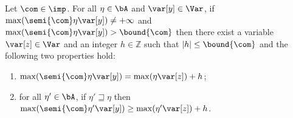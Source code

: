 \begin{lemma}
  \label{le:inc}
  Let \(\com\in \imp\).
  For all \(\eta \in \bA\) and \(\var[y] \in \Var\), if
  \(\max(\semi{\com} \eta \var[y]) \neq +\infty\) and
  \(\max(\semi{\com}\eta \var[y]) > \bound{\com}\) then there exist a
  variable \(\var[z] \in \Var\) and an integer \(h \in \mathbb{Z}\)
  such that \(|h| \leq \bound{\com}\) and the following two properties
  hold:
  \begin{enumerate}[label=(\roman*)]
  \item \(\max(\semi{\com}\eta \var[y]) = \max(\eta \var[z]) + h\); \label{point1}
  \item  for all \(\eta' \in \bA\), if \(\eta' \sqsupseteq \eta\)
    then
    \(\max(\semi{\com}\eta' \var[y]) \geq \max(\eta' \var[z]) + h\). \label{point2}
  \end{enumerate}
\end{lemma}

